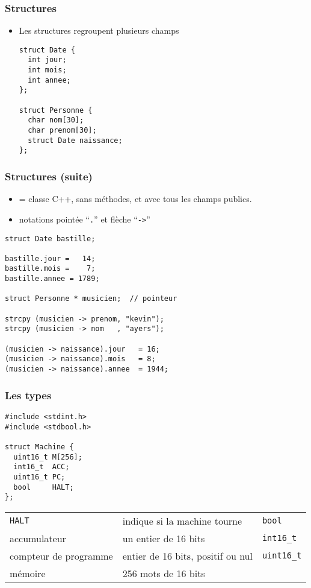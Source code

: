 \documentclass[]{beamer}
\begin{document}
\begin{frame}[containsverbatim]
  \frametitle{Structures}
  \begin{itemize}
  \item Les \alert{structures} regroupent plusieurs \alert{champs}

\begin{lstlisting}[style=sourcec]
struct Date {
  int jour;
  int mois;
  int annee;
};

struct Personne {
  char nom[30];
  char prenom[30];
  struct Date naissance;
};
\end{lstlisting}
  \end{itemize}
\end{frame}

\begin{frame}[containsverbatim]
  \frametitle{Structures (suite)}
  \begin{itemize}
\item = \alert{classe} C++, \alert{sans méthodes}, 
et avec tous les \alert{champs publics}.
\item notations pointée ``\verb+.+'' et flèche ``\verb+->+''
  \end{itemize}
{\small
\begin{lstlisting}[style=sourcec]
struct Date bastille;

bastille.jour =   14;
bastille.mois =    7;
bastille.annee = 1789;

struct Personne * musicien;  // pointeur

strcpy (musicien -> prenom, "kevin");
strcpy (musicien -> nom   , "ayers");

(musicien -> naissance).jour   = 16;
(musicien -> naissance).mois   = 8;
(musicien -> naissance).annee  = 1944;
\end{lstlisting}
}
\end{frame}




\begin{frame}[containsverbatim]
\frametitle{Les types}
\begin{lstlisting}[style=sourcec]
#include <stdint.h>
#include <stdbool.h>

struct Machine {
  uint16_t M[256];  
  int16_t  ACC;     
  uint16_t PC;      
  bool     HALT;
};
\end{lstlisting}
\begin{tabular}{lll}
\texttt{HALT} & indique si la machine tourne & \alert{\texttt{bool}} \\
accumulateur & un entier de 16 bits & \alert{\texttt{int16\_t}} \\
compteur de programme & entier de 16 bits, positif ou nul &\alert{\texttt{uint16\_t}} \\
mémoire & 256 mots de 16 bits & 
\end{tabular}

\end{frame}
\end{document}
